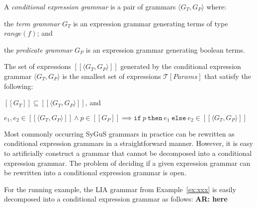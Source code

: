 \documentclass{llncs}
\newcommand\arsays[1]{{\bf AR: #1}}
\newcommand\tuple[1]{\langle #1 \rangle}
\newcommand\Expr{e}
\newcommand\Pred{p}
\newcommand\Grammar{G}
\newcommand\sem[1]{[\![ #1 ]\!]}
\newcommand\SynthFun{f}
\newcommand\range{\mathit{range}}
\newcommand\FormalParameters{\mathit{Params}}
\newcommand\Theory{\mathcal{T}}
\newcommand\ITE[3]{\mathtt{if}~#1~\mathtt{then}~#2~\mathtt{else}~#3}
\begin{document}
A {\em conditional expression grammar} is a pair of grammars $\tuple{
\Grammar_T, \Grammar_P }$ where:
\begin{inparaenum}[(a)]
\item the {\em term grammar} $\Grammar_T$ is an expression grammar
  generating terms of type $\range(\SynthFun)$; and
\item the {\em predicate grammar} $\Grammar_P$ is an expression
  grammar generating boolean terms.
\end{inparaenum}
The set of expressions $\sem{\tuple{ \Grammar_T, \Grammar_P }}$
generated by the conditional expression grammar $\tuple{ G_T, G_P }$ is
the smallest set of expressions $\Theory[\FormalParameters]$ that
satisfy the following:
\begin{inparaenum}[(a)]
\item $\sem{\Grammar_T} \subseteq \sem{\tuple{ \Grammar_T, \Grammar_P
  }}$, and
\item $\Expr_1, \Expr_2 \in \sem{\tuple{ \Grammar_T, \Grammar_P }}
  \wedge \Pred \in \sem{\Grammar_P} \implies
  \ITE{\Pred}{\Expr_1}{\Expr_2} \in \sem{\tuple{ \Grammar_T, \Grammar_P }}$
\end{inparaenum}

Most commonly occurring SyGuS grammars in practice can be rewritten
as conditional expression grammars in a straightforward manner.
However, it is easy to artificially construct a grammar that cannot be
decomposed into a conditional expression grammar.
The problem of deciding if a given expression grammar can be rewritten
into a conditional expression grammar is open.

\begin{example}
  For the running example, the LIA grammar from Example~\ref{ex:xxx} is
  easily decomposed into a conditional expression grammar as follows:
  \arsays{here}
\end{example}
\end{document}

